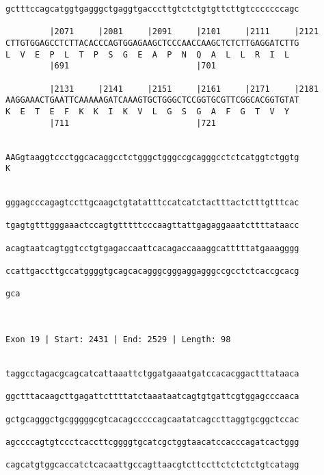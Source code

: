 \documentclass{article}
\begin{document}
\begin{Verbatim}
gctttccagcatggtgagggctgaggtgacccttgtctctgtgttcttgtcccccccagc
                                                            
         |2071     |2081     |2091     |2101     |2111     |2121
CTTGTGGAGCCTCTTACACCCAGTGGAGAAGCTCCCAACCAAGCTCTCTTGAGGATCTTG
L  V  E  P  L  T  P  S  G  E  A  P  N  Q  A  L  L  R  I  L  
         |691                          |701                 
  
         |2131     |2141     |2151     |2161     |2171     |2181
AAGGAAACTGAATTCAAAAAGATCAAAGTGCTGGGCTCCGGTGCGTTCGGCACGGTGTAT
K  E  T  E  F  K  K  I  K  V  L  G  S  G  A  F  G  T  V  Y  
         |711                          |721                 
  
                                                            
AAGgtaaggtccctggcacaggcctctgggctgggccgcagggcctctcatggtctggtg
K                                                           
                                                            
  
gggagcccagagtccttgcaagctgtatatttccatcatctactttactctttgtttcac
                                                            
tgagtgtttgggaaactccagtgtttttcccaagttattgagaggaaatcttttataacc
                                                            
acagtaatcagtggtcctgtgagaccaattcacagaccaaaggcatttttatgaaagggg
                                                            
ccattgaccttgccatggggtgcagcacagggcgggaggagggccgcctctcaccgcacg
                                                            
gca
   
   
 
Exon 19 | Start: 2431 | End: 2529 | Length: 98


taggcctagacgcagcatcattaaattctggatgaaatgatccacacggactttataaca
                                                            
ggctttacaagcttgagattcttttatctaaataatcagtgtgattcgtggagcccaaca
                                                            
gctgcagggctgcgggggcgtcacagcccccagcaatatcagccttaggtgcggctccac
                                                            
agccccagtgtccctcaccttcggggtgcatcgctggtaacatccacccagatcactggg
                                                            
cagcatgtggcaccatctcacaattgccagttaacgtcttccttctctctctgtcatagg
                                                            

\end{Verbatim}
\end{document}
